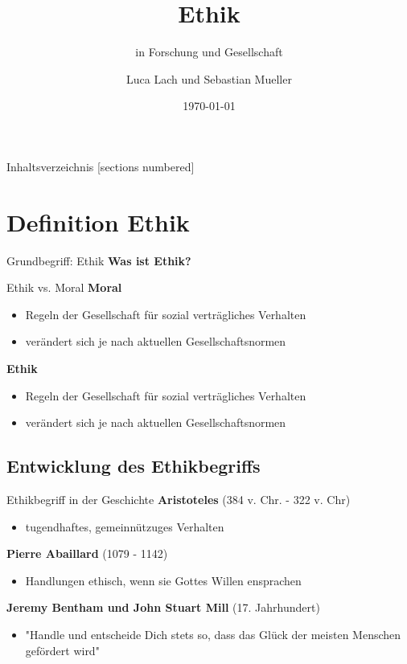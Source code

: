 \documentclass[10pt]{beamer}
\title{Ethik}
\subtitle{in Forschung und Gesellschaft}
\date{\today}
\author{Luca Lach und Sebastian Mueller}
\institute{Aperture Science}
\begin{document}
		
	\maketitle
	
	\begin{frame}{Inhaltsverzeichnis}
		[sections numbered]
		\tableofcontents[hideallsubsections]
	\end{frame}
	
\section{Definition Ethik}
	\begin{frame}{Grundbegriff: Ethik}
		\textbf{Was ist Ethik?}
	\end{frame}
	
	\begin{frame}{Ethik vs. Moral}
		\textbf{Moral}
			\begin{itemize}
				\item Regeln der Gesellschaft für sozial verträgliches Verhalten
				\item verändert sich je nach aktuellen Gesellschaftsnormen
			\end{itemize}
		\textbf{Ethik}
		\begin{itemize}
			\item Regeln der Gesellschaft für sozial verträgliches Verhalten
			\item verändert sich je nach aktuellen Gesellschaftsnormen
		\end{itemize}
			
	\end{frame}
		

	
\subsection{Entwicklung des Ethikbegriffs}
	\begin{frame}{Ethikbegriff in der Geschichte}
		\textbf{Aristoteles} (384 v. Chr. - 322 v. Chr)
		\begin{itemize}
			\item tugendhaftes, gemeinnützuges Verhalten
		\end{itemize}
		
		\textbf{Pierre Abaillard} (1079 - 1142)
		\begin{itemize}
			\item Handlungen ethisch, wenn sie Gottes Willen ensprachen
		\end{itemize}
		
		\textbf{Jeremy Bentham und John Stuart Mill} (17. Jahrhundert)
		\begin{itemize}
			\item "Handle und entscheide Dich stets so, dass das Glück der
			meisten Menschen gefördert wird"
		\end{itemize}
	\end{frame}
	
\end{document}
